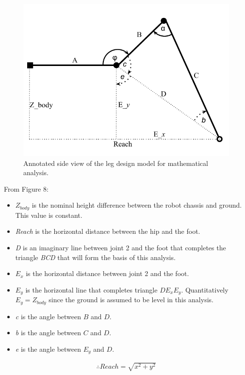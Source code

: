 \begin{figure}[h]
\centering
\includegraphics[scale = 1]{pics/Leg_design_4.pdf}
\caption{Annotated side view of the leg design model for mathematical analysis.}
\label{fig:Leg_design_4}
\end{figure}

From Figure 8:
\begin{itemize}
\item $Z_{body}$ is the nominal height difference between the robot chassis and ground. This value is constant.
\item \textit{Reach} is the horizontal distance between the hip and the foot.
\item \textit{D} is an imaginary line between joint 2 and the foot that completes the triangle \textit{BCD} that will form the basis of this analysis.
\item $E_x$ is the horizontal distance between joint 2 and the foot.
\item $E_y$ is the horizontal line that completes triangle $DE_xE_y$. Quantitatively $E_y = Z_{body}$ since the ground is assumed to be level in this analysis.
\item \textit{c} is the angle between $B$ and $D$.
\item \textit{b} is the angle between $C$ and $D$.
\item \textit{e} is the angle between $E_y$ and $D$.
\end{itemize}

\begin{align}
\therefore Reach = \sqrt{x^2+y^2}
\end{align}

